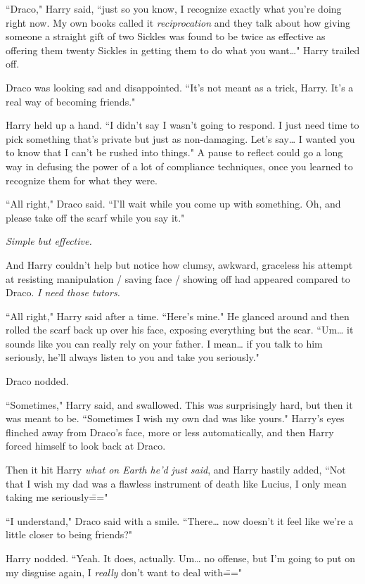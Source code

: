 ``Draco," Harry said, ``just so you know, I recognize exactly what you're doing right now. My own books called it \emph{reciprocation} and they talk about how giving someone a straight gift of two Sickles was found to be twice as effective as offering them twenty Sickles in getting them to do what you want{\ldots}" Harry trailed off.

Draco was looking sad and disappointed. ``It's not meant as a trick, Harry. It's a real way of becoming friends."

Harry held up a hand. ``I didn't say I wasn't going to respond. I just need time to pick something that's private but just as non-damaging. Let's say{\ldots} I wanted you to know that I can't be rushed into things." A pause to reflect could go a long way in defusing the power of a lot of compliance techniques, once you learned to recognize them for what they were.

``All right," Draco said. ``I'll wait while you come up with something. Oh, and please take off the scarf while you say it."

\emph{Simple but effective.}

And Harry couldn't help but notice how clumsy, awkward, graceless his attempt at resisting manipulation / saving face / showing off had appeared compared to Draco. \emph{I need those tutors.}

``All right," Harry said after a time. ``Here's mine." He glanced around and then rolled the scarf back up over his face, exposing everything but the scar. ``Um{\ldots} it sounds like you can really rely on your father. I mean{\ldots} if you talk to him seriously, he'll always listen to you and take you seriously."

Draco nodded.

``Sometimes," Harry said, and swallowed. This was surprisingly hard, but then it was meant to be. ``Sometimes I wish my own dad was like yours." Harry's eyes flinched away from Draco's face, more or less automatically, and then Harry forced himself to look back at Draco.

Then it hit Harry \emph{what on Earth he'd just said}, and Harry hastily added, ``Not that I wish my dad was a flawless instrument of death like Lucius, I only mean taking me seriously\==="

``I understand," Draco said with a smile. ``There{\ldots} now doesn't it feel like we're a little closer to being friends?"

Harry nodded. ``Yeah. It does, actually. Um{\ldots} no offense, but I'm going to put on my disguise again, I \emph{really} don't want to deal with\==="

